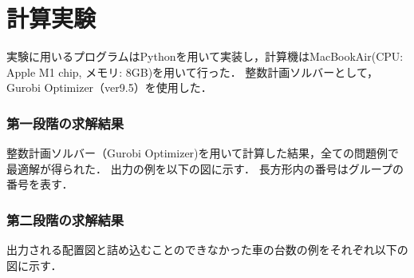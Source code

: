 \chapter{計算実験}\label{computational_result}
実験に用いるプログラムはPythonを用いて実装し，計算機はMacBookAir(CPU: Apple M1 chip, メモリ: 8GB)を用いて行った．
整数計画ソルバーとして，Gurobi Optimizer（ver9.5）を使用した．

\subsection{第一段階の求解結果}
整数計画ソルバー（Gurobi Optimizer)を用いて計算した結果，全ての問題例で最適解が得られた．
出力の例を以下の図に示す．
長方形内の番号はグループの番号を表す．

\subsection{第二段階の求解結果}
出力される配置図と詰め込むことのできなかった車の台数の例をそれぞれ以下の図に示す．


